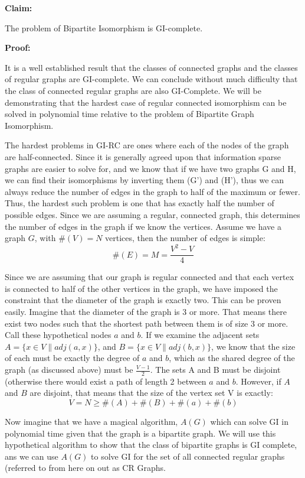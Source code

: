 \documentclass{article}
\begin{document}
 

\textbf{Claim:} 

The problem of Bipartite Isomorphism is GI-complete.

\textbf{Proof:}


It is a well established result that the classes of connected graphs and the classes of regular
graphs are GI-complete.  We can conclude without much difficulty that the class of connected
regular graphs are also GI-Complete. We will be demonstrating that the hardest case of
regular connected isomorphism can be solved in polynomial time relative to the problem of
Bipartite Graph Isomorphism.

The hardest problems in GI-RC are ones where each of the nodes of the graph are
half-connected.  Since it is generally agreed upon that information sparse graphs are easier
to solve for, and we know that if we have two graphs G and H, we can find their isomorphisms
by inverting them (G') and (H'), thus we can always reduce the number of edges in the graph
to half of the maximum or fewer. Thus, the hardest such problem is one that has exactly half
the number of possible edges.  Since we are assuming a regular, connected graph, this
determines the number of edges in the graph if we know the vertices. Assume we have a graph 
\(G\), with \(\#(V) = N\) vertices, then the number of edges is simple: 
\[\#(E) = M = \frac{V^2 - V}{4}\]

Since we are assuming that our graph is regular connected and that each vertex is connected to half
of the other vertices in the graph, we have imposed the constraint that the diameter of the graph
is exactly two. This can be proven easily. Imagine that the diameter of the graph is 3 or more.
That means there exist two nodes such that the shortest path between them is of size 3 or more.
Call these hypothetical nodes \(a\) and \(b\).  If we examine the adjacent sets \(A = \{x \in V \| adj(a, x)\}\), and
\(B = \{x \in V \| adj(b, x)\}\), we know that the size of each must be exactly the degree of \(a\) and
\(b\), which as the shared degree of the graph (as discussed above) must be \(\frac{V-1}{2}\).
The sets A and B must be disjoint (otherwise there would exist a path of length 2 between \(a\)
and \(b\).  However, if \(A\) and \(B\) are disjoint, that means that the size of the vertex set V
is exactly: 
\[V = N \geq \#(A) + \#(B) + \#(a) + \#(b)\]



Now imagine that we have a magical algorithm, \(A(G)\) which can solve GI in polynomial
time given that the graph is a bipartite graph.  We will use this hypothetical algorithm to show
that the class of bipartite graphs is GI complete, ans we can use \(A(G)\) to solve GI for the
set of all connected regular graphs (referred to from here on out as CR Graphs.
\end{document}
